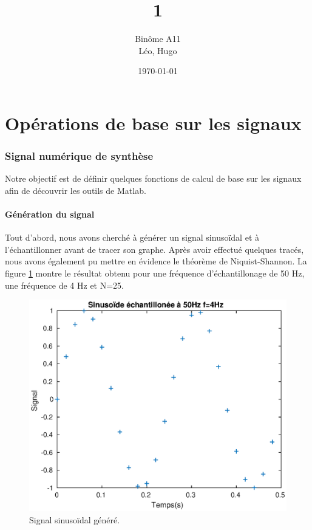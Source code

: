 \documentclass[french]{article}
\title{\bsc{SIG} 1}
\author{Binôme A11 \\ \bsc{Simon} Léo, \bsc{Levy--Falk} Hugo}
\date{\today}
\begin{document}
\maketitle
\tableofcontents
\clearpage
\listoffigures
\newpage


\part{Opérations de base sur les signaux}

\section{Signal numérique de synthèse}

Notre objectif  est de définir quelques fonctions de calcul de base sur les signaux afin de découvrir les outils de Matlab.

\subsection{Génération du signal}

Tout d'abord, nous avons cherché à générer un signal sinusoïdal et à l'échantillonner avant de tracer son graphe. Après avoir effectué quelques tracés, nous avons également pu mettre en évidence le théorème de Niquist-Shannon. La figure \ref{signalSin} montre le résultat obtenu pour une fréquence d'échantillonage de 50 Hz, une fréquence de 4 Hz et N=25.

\begin{figure}[h!]
\centering
\includegraphics{images/signalSinus.eps}
\caption{Signal sinusoïdal généré.}
\label{signalSin}
\end{figure}
\end{document}
